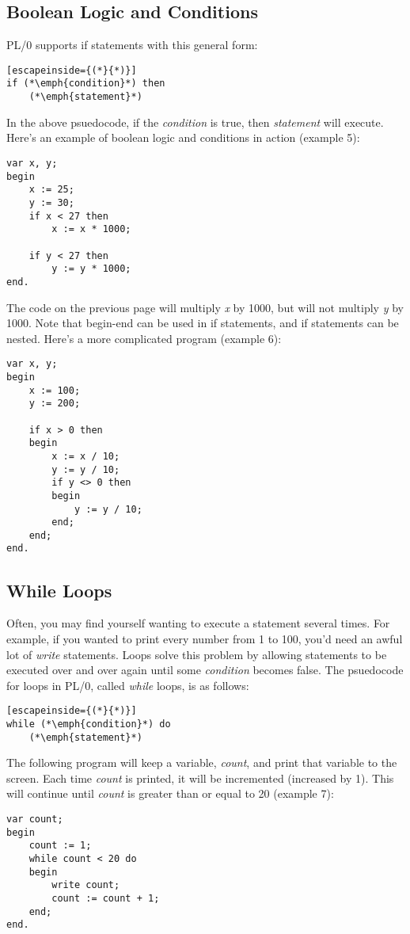 \documentclass[12pt]{memoir}
\begin{document}
\subsection*{Boolean Logic and Conditions}
PL/0 supports if statements with this general form:
\begin{lstlisting}[escapeinside={(*}{*)}]
if (*\emph{condition}*) then
    (*\emph{statement}*)
\end{lstlisting}
In the above psuedocode, if the \emph{condition} is true, then \emph{statement}
will execute. Here's an example of boolean logic and conditions in action (example 5):
\begin{lstlisting}
var x, y;
begin
    x := 25;
    y := 30;
    if x < 27 then
        x := x * 1000;

    if y < 27 then
        y := y * 1000;
end.
\end{lstlisting}

\pagebreak

The code on the previous page will multiply \emph{x} by 1000, but will not multiply
\emph{y} by 1000. Note that begin-end can be used in if statements, and if statements
can be nested. Here's a more complicated program (example 6):
\begin{lstlisting}
var x, y;
begin
    x := 100;
    y := 200;
    
    if x > 0 then
    begin
        x := x / 10;
        y := y / 10;
        if y <> 0 then
        begin
            y := y / 10;
        end;
    end;
end.
\end{lstlisting}

\subsection*{While Loops}
Often, you may find yourself wanting to execute a statement several times. For example,
if you wanted to print every number from 1 to 100, you'd need an awful lot of \emph{write}
statements. Loops solve this problem by allowing statements to be executed over and over
again until some \emph{condition} becomes false. The psuedocode for loops in PL/0,
called \emph{while} loops, is as follows:
\begin{lstlisting}[escapeinside={(*}{*)}]
while (*\emph{condition}*) do
    (*\emph{statement}*)
\end{lstlisting}
The following program will keep a variable, \emph{count}, and print that variable to the screen.
Each time \emph{count} is printed, it will be incremented (increased by 1). This will
continue until \emph{count} is greater than or equal to 20 (example 7):
\begin{lstlisting}
var count;
begin
    count := 1;
    while count < 20 do
    begin
        write count;
        count := count + 1;
    end;
end.
\end{lstlisting}
\end{document}
